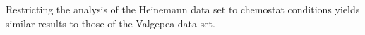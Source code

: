 
  Restricting the analysis of the Heinemann data set to chemostat conditions yields similar results to those of the Valgepea data set.
